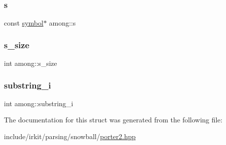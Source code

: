 \mbox{\label{structamong_a65bb5a8443fbadd3361d34f539fafd6e}} 
\subsubsection{\texorpdfstring{s}{s}}
{\footnotesize\ttfamily const \mbox{\hyperlink{porter2_8hpp_a04438e24473719aaf288c57833717164}{symbol}}$\ast$ among\+::s}

\mbox{\label{structamong_a6306033b3dac70733b6369d8c857fa17}} 
\subsubsection{\texorpdfstring{s\+\_\+size}{s\_size}}
{\footnotesize\ttfamily int among\+::s\+\_\+size}

\mbox{\label{structamong_a51cda31a957593437c642a1572454131}} 
\subsubsection{\texorpdfstring{substring\+\_\+i}{substring\_i}}
{\footnotesize\ttfamily int among\+::substring\+\_\+i}



The documentation for this struct was generated from the following file\+:\begin{DoxyCompactItemize}
\item 
include/irkit/parsing/snowball/\mbox{\hyperlink{porter2_8hpp}{porter2.\+hpp}}\end{DoxyCompactItemize}
